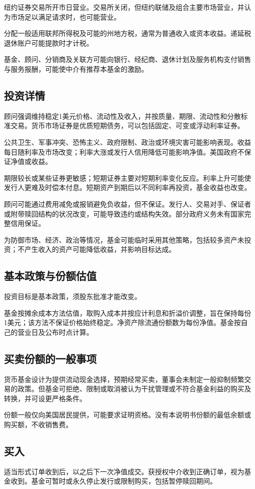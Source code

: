 \documentclass[UTF8,fontset=none,11pt,a4paper]{ctexart}
\begin{document}
纽约证券交易所开市日营业。交易所关闭，但纽约联储及组合主要市场营业，并认为市场足以满足请求时，也可能营业。


分配一般适用联邦所得税及可能的州地方税，通常为普通收入或资本收益。递延税退休账户可能提款时才计税。


基金、顾问、分销商及关联方可能向银行、经纪商、退休计划及服务机构支付销售与服务报酬，可能使中介有推荐本基金的激励。


\subsection*{投资详情}
顾问强调维持稳定1美元价格、流动性及收入，并按质量、期限、流动性和分散标准交易。货币市场证券是优质短期债务，可以包括固定、可变或浮动利率证券。


公共卫生、军事冲突、恐怖主义、政府限制、政治或环境灾害可能影响表现。收益每日随利率及市场改变；利率大涨或发行人信用降低可能影响净值。美国政府不保证净值或收益。


期限较长或某些证券更敏感；短期证券主要对短期利率变化反应。利率上升可能使发行人更难及时偿本付息。短期资产到期后以不同利率再投资，基金收益也改变。


顾问可能通过费用减免或报销避免负收益，但不保证。发行人、交易对手、保证者或附带赎回结构的状况改变，可能导致违约或结构失效。部分政府义务未有国家完整信用保证。


为防御市场、经济、政治等情况，基金可能临时采用其他策略，包括较多资产未投资；不产生收入的资产可能降低收益，并影响目标达成。


\subsection*{基本政策与份额估值}
投资目标是基本政策，须股东批准才能改变。


基金按摊余成本方法估值，取购入成本并按应计利息和折溢价调整，旨在保持每份1美元；该方法不保证价格始终稳定。净资产除流通份额数为每份净值。基金按自己的营业日及公布时点计算。


\subsection*{买卖份额的一般事项}
货币基金设计为提供流动现金选择，预期经常买卖，董事会未制定一般抑制频繁交易的政策。但基金可拒绝、限制或取消被认为干扰管理或不符合基金利益的购买及转换，并可设更严格条件。


份额一般仅向美国居民提供，可能要求证明资格。没有本说明书份额的最低余额或购买额，不收销售费。


\subsection*{买入}
适当形式订单收到后，以之后下一次净值成交。获授权中介收到正确订单，视为基金收到。基金可暂时或永久停止发行或限制购买，包括暂停赎回期间。
\end{document}
